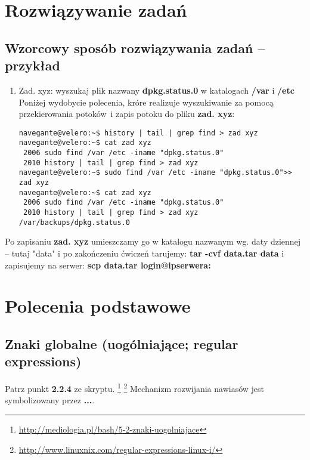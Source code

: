 \documentclass[a4paper,titlepage,12pt]{mwart}
\begin{document}
\section{Rozwiązywanie zadań}
\subsection{Wzorcowy sposób rozwiązywania zadań -- przykład}
\begin{enumerate}
\item{Zad. xyz: wyszukaj plik nazwany \textbf{dpkg.status.0} w katalogach \textbf{/var} i \textbf{/etc}}\newline
Poniżej wydobycie polecenia, króre realizuje wyszukiwanie za pomocą przekierowania potoków~i zapis potoku do pliku \textbf{zad. xyz}:
\begin{verbatim}
navegante@velero:~$ history | tail | grep find > zad xyz
navegante@velero:~$ cat zad xyz
 2006 sudo find /var /etc -iname "dpkg.status.0"
 2010 history | tail | grep find > zad xyz
navegante@velero:~$ sudo find /var /etc -iname "dpkg.status.0">> zad xyz
navegante@velero:~$ cat zad xyz
 2006 sudo find /var /etc -iname "dpkg.status.0"
 2010 history | tail | grep find > zad xyz
/var/backups/dpkg.status.0
\end{verbatim}
\end{enumerate}
Po zapisaniu \textbf{zad. xyz} umieszczamy go w katalogu nazwanym wg. daty dziennej -- tutaj "data" i po zakończeniu ćwiczeń tarujemy: \textbf{tar -cvf data.tar data} i zapisujemy na serwer: \textbf{scp data.tar login@ipserwera:}
\section{Polecenia podstawowe}
\subsection{Znaki globalne (uogólniające; regular expressions)}
Patrz punkt \textbf{2.2.4} ze skryptu.
\footnote{\url{http://mediologia.pl/bash/5-2-znaki-uogolniajace}}
\footnote{\url{http://www.linuxnix.com/regular-expressions-linux-i/}}
Mechanizm rozwijania nawiasów jest symbolizowany przez \textbf{...}.
\end{document}
